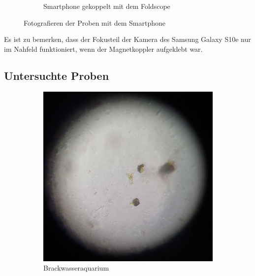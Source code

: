 \begin{figure}[H]
\begin{subfigure}[b]{0.45\textwidth}
				\caption{Smartphone gekoppelt mit dem Foldscope}
			\end{subfigure}
			\caption{Fotografieren der Proben mit dem Smartphone}
			\vspace{-1em}
		\end{figure}
		Es ist zu bemerken, dass der Fokusteil der Kamera des Samsung Galaxy S10e nur im Nahfeld funktioniert, wenn der Magnetkoppler aufgeklebt war. 
	\vspace{-1em}
	\subsection{Untersuchte Proben}
		\begin{figure}[H]
			\centering
			\begin{subfigure}[b]{0.3\textwidth}
				\includegraphics[width=\textwidth]{images/tv2/probe_Aquarium.jpg}
				\caption{Brackwasseraquarium}
				\label{fig:aquarium}
			\end{subfigure}
			\hspace{5pt}
			\begin{subfigure}[b]{0.3\textwidth}

\end{subfigure}
\end{figure}
